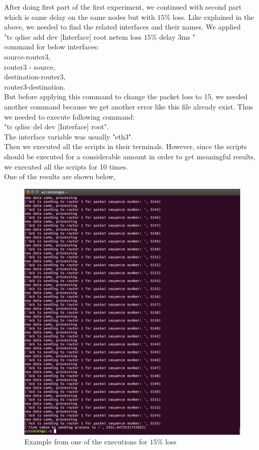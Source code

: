 \documentclass[conference]{IEEEtran}
\begin{document}
After doing first part of the first experiment, we continued with second part which is same delay on the same nodes but with $15\%$ loss. Like explained in the above, we needed to find the related interfaces and their names. We applied \\
"tc qdisc add dev [Interface] root netem loss $15\%$ delay 3ms "\\ command for below interfaces:\\
source-router3,\\
router3 - source,\\
destination-router3,\\
router3-destination.\\
But before applying this command to change the packet loss to 15, we needed another command because we get another error like this file already exist. Thus we needed to execute following command:\\
"tc qdisc del dev [Interface] root".\\
The interface variable was usually "eth3".\\
Then we executed all the scripts in their terminals. However, since the scripts should be executed for a considerable amount in order to get meaningful results, we executed all the scripts for 10 times. \\
One of the results are shown below,

\begin{figure}[H]
    \centering
    \includegraphics[scale=0.13]{15loss.png}
    \caption{Example from one of the executions for $15\%$ loss }
\end{figure}
\end{document}
